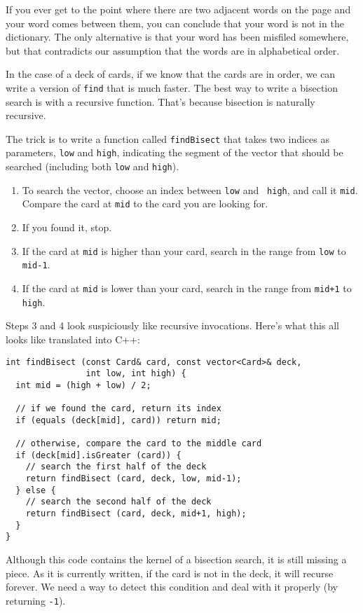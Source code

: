 If you ever get to the point where there are two adjacent words on the
page and your word comes between them, you can conclude that your word
is not in the dictionary.  The only alternative is that your word has
been misfiled somewhere, but that contradicts our assumption that the
words are in alphabetical order.

In the case of a deck of cards, if we know that the cards are in
order, we can write a version of {\tt find} that is much faster.  The
best way to write a bisection search is with a recursive function.
That's because bisection is naturally recursive.


The trick is to write a function called {\tt findBisect} that takes
two indices as parameters, {\tt low} and {\tt high}, indicating the
segment of the vector that should be searched (including both
{\tt low} and {\tt high}).

\begin{enumerate}

\item To search the vector, choose an index between {\tt low} and {\tt
high}, and call it {\tt mid}.  Compare the card at {\tt mid} to the
card you are looking for.

\item If you found it, stop.

\item If the card at {\tt mid} is higher than your card, search
in the range from {\tt low} to {\tt mid-1}.

\item If the card at {\tt mid} is lower than your card, search
in the range from {\tt mid+1} to {\tt high}.

\end{enumerate}
%
Steps 3 and 4 look suspiciously like recursive
invocations.  Here's what this all looks like translated into
C++:

\begin{lstlisting}
int findBisect (const Card& card, const vector<Card>& deck,
                int low, int high) {
  int mid = (high + low) / 2;

  // if we found the card, return its index
  if (equals (deck[mid], card)) return mid;

  // otherwise, compare the card to the middle card
  if (deck[mid].isGreater (card)) {
    // search the first half of the deck
    return findBisect (card, deck, low, mid-1);
  } else {
    // search the second half of the deck
    return findBisect (card, deck, mid+1, high);
  }
}
\end{lstlisting}
%
Although this code contains the kernel of a bisection search, it
is still missing a piece.  As it is currently written,
if the card is not in the deck, it will recurse forever.  We
need a way to detect this condition and deal with it properly
(by returning {\tt -1}).


